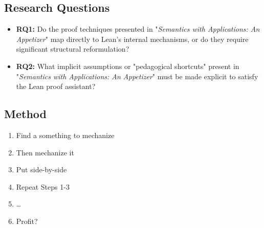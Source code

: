 \documentclass[xcolor={dvipsnames,table}]{beamer}
\begin{document}
\begin{frame}
  \section*{Research Questions}
  \begin{itemize}
    \item<1-> \textbf{RQ1:} Do the proof techniques presented in "\emph{Semantics with Applications: An Appetizer}"
    map directly to Lean's internal mechanisms, or do they require significant
    structural reformulation?

    \item<2-> \textbf{RQ2:} What implicit assumptions or "pedagogical shortcuts"
    present in "\emph{Semantics with Applications: An Appetizer}" must be made explicit to satisfy the Lean proof assistant?
  \end{itemize}
\end{frame}

\begin{frame}
    \section{Method}
    \begin{enumerate}
        \item Find a something to mechanize
        \item Then mechanize it
        \item Put side-by-side
        \item Repeat Steps 1-3
        \item \dots
        \item Profit?
    \end{enumerate}
\end{frame}
\end{document}
